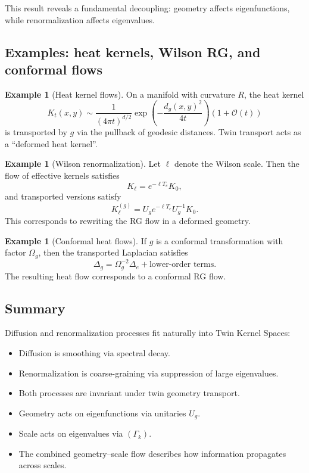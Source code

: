 \documentclass[11pt]{article}
\theoremstyle{definition}
\newtheorem{example}[theorem]{Example}
\begin{document}
This result reveals a fundamental decoupling: geometry affects eigenfunctions, while renormalization affects eigenvalues.

\subsection{Examples: heat kernels, Wilson RG, and conformal flows}

\begin{example}[Heat kernel flows]
	On a manifold with curvature $R$, the heat kernel
	\[
	K_t(x,y) \sim \frac{1}{(4\pi t)^{d/2}}
	\exp\!\left(-\frac{d_g(x,y)^2}{4t}\right)(1+\mathcal{O}(t))
	\]
	is transported by $g$ via the pullback of geodesic distances.
	Twin transport acts as a “deformed heat kernel”.
\end{example}

\begin{example}[Wilson renormalization]
	Let $\ell$ denote the Wilson scale.
	Then the flow of effective kernels satisfies
	\[
	K_\ell = e^{-\ell T_e} K_0,
	\]
	and transported versions satisfy
	\[
	K_\ell^{(g)} = U_g e^{-\ell T_e} U_g^{-1}K_0.
	\]
	This corresponds to rewriting the RG flow in a deformed geometry.
\end{example}

\begin{example}[Conformal heat flows]
	If $g$ is a conformal transformation with factor $\Omega_g$,
	then the transported Laplacian satisfies
	\[
	\Delta_g = \Omega_g^{-2}\Delta_e + \text{lower-order terms}.
	\]
	The resulting heat flow corresponds to a conformal RG flow.
\end{example}

\subsection{Summary}

Diffusion and renormalization processes fit naturally into Twin Kernel Spaces:
\begin{itemize}[itemsep=3pt]
	\item Diffusion is smoothing via spectral decay.
	\item Renormalization is coarse-graining via suppression of large eigenvalues.
	\item Both processes are invariant under twin geometry transport.
	\item Geometry acts on eigenfunctions via unitaries $U_g$.
	\item Scale acts on eigenvalues via $(\Gamma_k)$.
	\item The combined geometry–scale flow describes how information propagates across scales.
\end{itemize}
\end{document}
